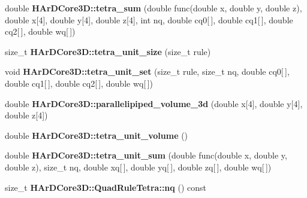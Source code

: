 \begin{DoxyCompactItemize}
\item 
\mbox{\label{group__Quadratures_ga3d29f4e825b8ce8abed864fe61c1e547}} 
double {\bfseries H\+Ar\+D\+Core3\+D\+::tetra\+\_\+sum} (double func(double x, double y, double z), double x\mbox{[}4\mbox{]}, double y\mbox{[}4\mbox{]}, double z\mbox{[}4\mbox{]}, int nq, double cq0\mbox{[}$\,$\mbox{]}, double cq1\mbox{[}$\,$\mbox{]}, double cq2\mbox{[}$\,$\mbox{]}, double wq\mbox{[}$\,$\mbox{]})
\item 
\mbox{\label{group__Quadratures_ga2959cdcee47b26f7661359afc848098f}} 
size\+\_\+t {\bfseries H\+Ar\+D\+Core3\+D\+::tetra\+\_\+unit\+\_\+size} (size\+\_\+t rule)
\item 
\mbox{\label{group__Quadratures_ga49d3a11aa2d74a16bfda192b67d69f3d}} 
void {\bfseries H\+Ar\+D\+Core3\+D\+::tetra\+\_\+unit\+\_\+set} (size\+\_\+t rule, size\+\_\+t nq, double cq0\mbox{[}$\,$\mbox{]}, double cq1\mbox{[}$\,$\mbox{]}, double cq2\mbox{[}$\,$\mbox{]}, double wq\mbox{[}$\,$\mbox{]})
\item 
\mbox{\label{group__Quadratures_ga36434a8319a40c91a5deafaa2c38f6f3}} 
double {\bfseries H\+Ar\+D\+Core3\+D\+::parallelipiped\+\_\+volume\+\_\+3d} (double x\mbox{[}4\mbox{]}, double y\mbox{[}4\mbox{]}, double z\mbox{[}4\mbox{]})
\item 
\mbox{\label{group__Quadratures_gaf3ff72076364ccf402a9de3040cae812}} 
double {\bfseries H\+Ar\+D\+Core3\+D\+::tetra\+\_\+unit\+\_\+volume} ()
\item 
\mbox{\label{group__Quadratures_ga59fc38494b2b1789e1b5e3db3329646c}} 
double {\bfseries H\+Ar\+D\+Core3\+D\+::tetra\+\_\+unit\+\_\+sum} (double func(double x, double y, double z), size\+\_\+t nq, double xq\mbox{[}$\,$\mbox{]}, double yq\mbox{[}$\,$\mbox{]}, double zq\mbox{[}$\,$\mbox{]}, double wq\mbox{[}$\,$\mbox{]})
\item 
\mbox{\label{group__Quadratures_gab736fa08c7510bf06428c7ee938e0c7c}} 
size\+\_\+t {\bfseries H\+Ar\+D\+Core3\+D\+::\+Quad\+Rule\+Tetra\+::nq} () const
\item 
\mbox{\label{group__Quadratures_gac7d6d0fcc8f63e38967d020d9023ad62}} 

\end{DoxyCompactItemize}
